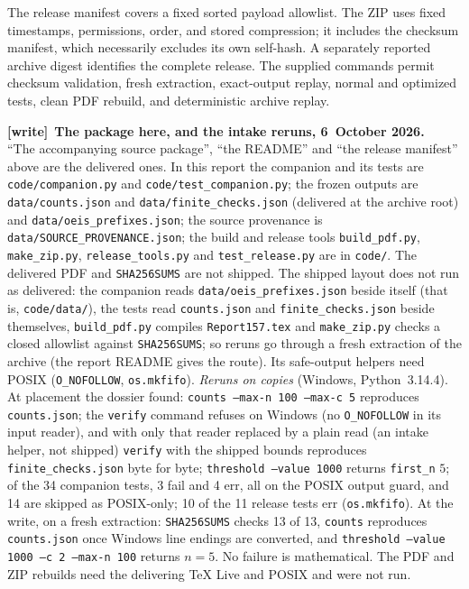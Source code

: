 \documentclass[11pt,letterpaper]{article}
\numberwithin{equation}{section}
\theoremstyle{remark}\newtheorem{remark}[theorem]{Remark}
\newcommand{\file}[1]{\nolinkurl{#1}}
\newenvironment{writenote}[1][]{\par\smallskip\begingroup\small
 \noindent\textbf{[write]}\if\relax\detokenize{#1}\relax\else~\textbf{#1.}\fi\ }%
 {\par\endgroup\smallskip}
\begin{document}
The release manifest covers a fixed sorted payload allowlist. The ZIP
uses fixed timestamps, permissions, order, and stored compression; it
includes the checksum manifest, which necessarily excludes its own
self-hash. A separately reported archive digest identifies the complete
release. The supplied commands permit checksum validation, fresh
extraction, exact-output replay, normal and optimized tests, clean PDF
rebuild, and deterministic archive replay.

\begin{writenote}[The package here, and the intake reruns, 6~October 2026]
``The accompanying source package'', ``the README'' and ``the release
manifest'' above are the delivered ones. In this report the companion and
its tests are \file{code/companion.py} and \file{code/test_companion.py}; the
frozen outputs are \file{data/counts.json} and \file{data/finite_checks.json}
(delivered at the archive root) and \file{data/oeis_prefixes.json}; the
source provenance is \file{data/SOURCE_PROVENANCE.json}; the build and
release tools \file{build_pdf.py}, \file{make_zip.py},
\file{release_tools.py} and \file{test_release.py} are in \file{code/}. The
delivered PDF and \file{SHA256SUMS} are not shipped. The shipped layout does
not run as delivered: the companion reads
\file{data/oeis_prefixes.json} beside itself (that is,
\file{code/data/}), the tests read \file{counts.json} and
\file{finite_checks.json} beside themselves, \file{build_pdf.py} compiles
\file{Report157.tex} and \file{make_zip.py} checks a closed allowlist against
\file{SHA256SUMS}; so reruns go through a fresh extraction of the archive
(the report README gives the route). Its safe-output helpers need POSIX
(\texttt{O\_NOFOLLOW}, \texttt{os.mkfifo}). \emph{Reruns on copies}
(Windows, Python~3.14.4). At placement the dossier found:
\texttt{counts --max-n 100 --max-c 5} reproduces \file{counts.json}; the
\texttt{verify} command refuses on Windows (no \texttt{O\_NOFOLLOW} in its
input reader), and with only that reader replaced by a plain read (an intake
helper, not shipped) \texttt{verify} with the shipped bounds reproduces
\file{finite_checks.json} byte for byte; \texttt{threshold --value 1000}
returns \texttt{first\_n} $5$; of the 34 companion tests, 3 fail and 4 err,
all on the POSIX output guard, and 14 are skipped as POSIX-only; 10 of the 11
release tests err (\texttt{os.mkfifo}). At the write, on a fresh extraction:
\file{SHA256SUMS} checks 13 of 13, \texttt{counts} reproduces
\file{counts.json} once Windows line endings are converted, and
\texttt{threshold --value 1000 --c 2 --max-n 100} returns $n=5$. No failure
is mathematical. The PDF and ZIP rebuilds need the delivering TeX Live and
POSIX and were not run.
\end{writenote}
\end{document}
